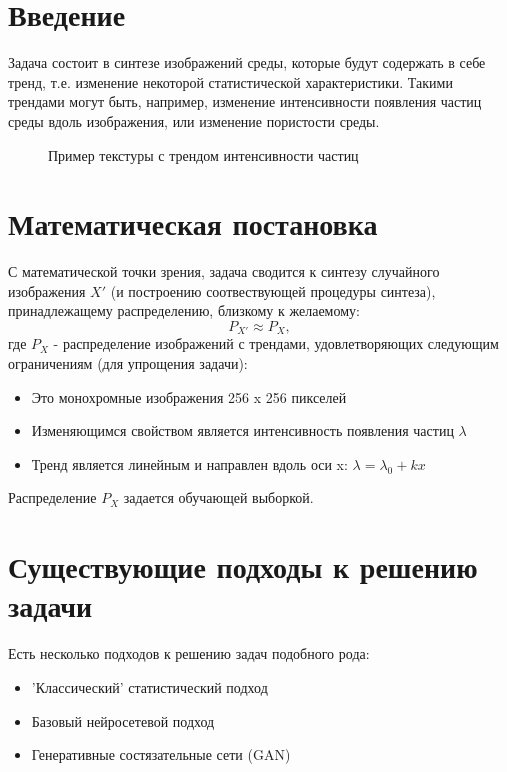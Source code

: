 \documentclass[a4paper]{article}
\begin{document}
	\section{Введение}
		Задача состоит в синтезе изображений среды, которые будут содержать в себе тренд, т.е. изменение некоторой статистической характеристики. Такими трендами могут быть, например, изменение интенсивности появления частиц среды вдоль изображения, или изменение пористости среды. \\
		\begin{figure}[h]
			\caption{Пример текстуры с трендом интенсивности частиц}
		\end{figure}
	\section{Математическая постановка}
		С математической точки зрения, задача сводится к синтезу случайного изображения $X'$ (и построению соотвествующей процедуры синтеза), принадлежащему распределению, близкому к желаемому:
		$$ P_{X'} \approx P_X,$$
		где $P_X$ - распределение изображений с трендами, удовлетворяющих следующим ограничениям (для упрощения задачи):
		\begin{itemize}
			\item Это монохромные изображения 256 x 256 пикселей
			\item Изменяющимся свойством является интенсивность появления частиц $\lambda$
			\item Тренд является линейным и направлен вдоль оси x: 
			$ \lambda = \lambda_0 + kx $
		\end{itemize}
		Распределение $P_X$ задается обучающей выборкой.
	\section{Существующие подходы к решению задачи}
		Есть несколько подходов к решению задач подобного рода:
		\begin{itemize}
			\item 'Классический' статистический подход
			\item Базовый нейросетевой подход
			\item Генеративные состязательные сети (GAN)
		\end{itemize}
\end{document}
